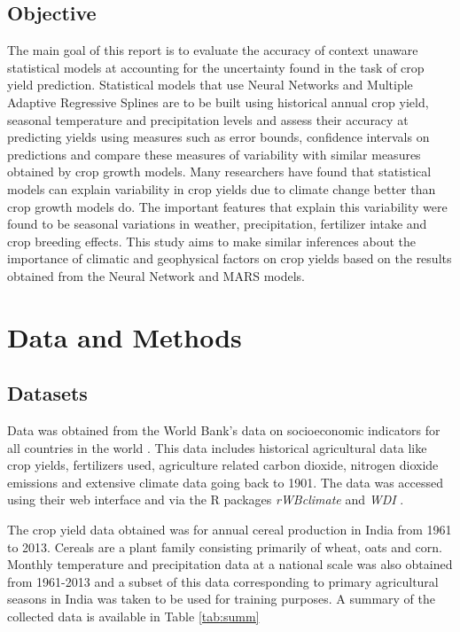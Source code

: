 \documentclass[conference]{IEEEtran}
\begin{document}
\subsection{Objective}
The main goal of this report is to evaluate the accuracy of context unaware statistical models at accounting for the uncertainty found in the task of crop yield prediction. Statistical models that use Neural Networks and Multiple Adaptive Regressive Splines are to be built using historical annual crop yield, seasonal temperature and precipitation levels and assess their accuracy at predicting yields using measures such as error bounds, confidence intervals on predictions and compare these measures of variability with similar measures obtained by crop growth models. Many researchers \cite{Wolfram2010} \cite{iizumi2013prediction} \cite{Gonzalez-Sanchez2014} have found that statistical models can explain variability in crop yields due to climate change better than crop growth models do. The important features that explain this variability were found to be seasonal variations in weather, precipitation, fertilizer intake and crop breeding effects. This study aims to make similar inferences about the importance of climatic and geophysical factors on crop yields based on the results obtained from the Neural Network and MARS models.

\section{Data and Methods}
\subsection{Datasets}
Data was obtained from the World Bank's data on socioeconomic indicators for all countries in the world \cite{World39:online}. This data includes historical agricultural data like crop yields, fertilizers used, agriculture related carbon dioxide, nitrogen dioxide emissions and extensive climate data going back to 1901. The data was accessed using their web interface and via the R packages \emph{rWBclimate} \cite{rwbclim2014} and \emph{WDI} \cite{wdipack}. 

The crop yield data obtained was for annual cereal production in India from 1961 to 2013. Cereals are a plant family consisting primarily of wheat, oats and corn. Monthly temperature and precipitation data at a national scale was also obtained from 1961-2013 and a subset of this data corresponding to primary agricultural seasons in India was taken to be used for training purposes. A summary of the collected data is available in Table \ref{tab:summ}
\end{document}
